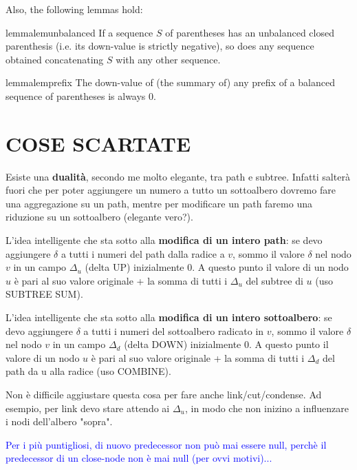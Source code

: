 \documentclass[a4paper,USenglish]{lipics}
\begin{document}
		Also, the following lemmas hold:
\begin{restatable}{lemma}{lemunbalanced}
			If a sequence $S$ of parentheses has an unbalanced closed parenthesis (i.e. its down-value is strictly negative), so does any sequence obtained concatenating $S$ with any other sequence.
\end{restatable}
\begin{restatable}{lemma}{lemprefix}
			The down-value of (the summary of) any prefix of a balanced sequence of parentheses is always 0.
\end{restatable}

\balancedseq*
\sumofsummaries*
\summarysumassociativity*
\lemfather*
\lemunbalanced*
\lemprefix*
\lemimpact*
\bc*


\section{COSE SCARTATE}

	Esiste una \textbf{dualità}, secondo me molto elegante, tra path e subtree. Infatti salterà fuori che per poter aggiungere un numero a tutto un sottoalbero dovremo fare una aggregazione su un path, mentre per modificare un path faremo una riduzione su un sottoalbero (elegante vero?).

	L'idea intelligente che sta sotto alla \textbf{modifica di un intero path}: se devo aggiungere $\delta$ a tutti i numeri del path dalla radice a $v$, sommo il valore $\delta$ nel nodo $v$ in un campo $\Delta_u$ (delta UP) inizialmente 0. A questo punto il valore di un nodo $u$ è pari al suo valore originale + la somma di tutti i $\Delta_u$ del subtree di $u$ (uso SUBTREE SUM).

	L'idea intelligente che sta sotto alla \textbf{modifica di un intero sottoalbero}: se devo aggiungere $\delta$ a tutti i numeri del sottoalbero radicato in $v$, sommo il valore $\delta$ nel nodo $v$ in un campo $\Delta_d$ (delta DOWN) inizialmente 0. A questo punto il valore di un nodo $u$ è pari al suo valore originale + la somma di tutti i $\Delta_d$ del path da u alla radice (uso COMBINE).

	Non è difficile aggiustare questa cosa per fare anche link/cut/condense. Ad esempio, per link devo stare attendo ai $\Delta_u$, in modo che non inizino a influenzare i nodi dell'albero "sopra".


			\textcolor{blue}{Per i più puntigliosi, di nuovo predecessor non può mai essere null, perchè il predecessor di un close-node non è mai null (per ovvi motivi)...}
\end{document}
